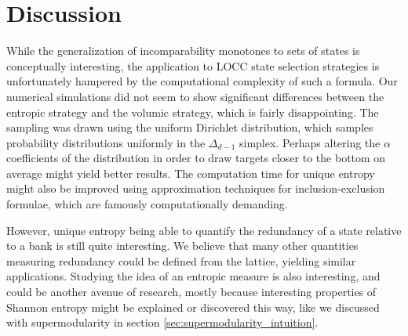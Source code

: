 \section{Discussion}

While the generalization of incomparability monotones to sets of states is conceptually interesting, the application to LOCC state selection strategies is unfortunately hampered by the computational complexity of such a formula. Our numerical simulations did not seem to show significant differences between the entropic strategy and the volumic strategy, which is fairly disappointing. The sampling was drawn using the uniform Dirichlet distribution, which samples probability distributions uniformly in the $\Delta_{d-1}$ simplex. Perhaps altering the $\alpha$ coefficients of the distribution in order to draw targets closer to the bottom on average might yield better results. The computation time for unique entropy might also be improved using approximation techniques for inclusion-exclusion formulae, which are famously computationally demanding.

However, unique entropy being able to quantify the redundancy of a state relative to a bank is still quite interesting. We believe that many other quantities measuring redundancy could be defined from the lattice, yielding similar applications. Studying the idea of an entropic measure is also interesting, and could be another avenue of research, mostly because interesting properties of Shannon entropy might be explained or discovered this way, like we discussed with supermodularity in section \ref{sec:supermodularity_intuition}.
